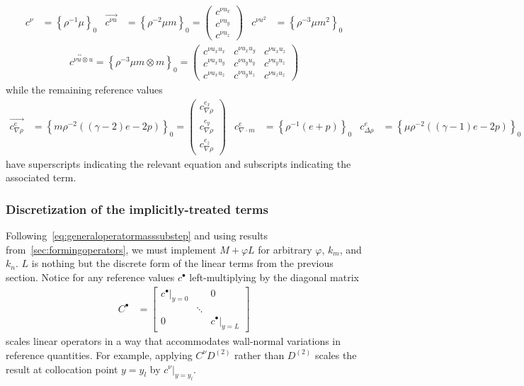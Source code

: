 \documentclass[letterpaper,11pt,nointlimits,reqno,draft]{amsart}
\newcommand{\reference}[1]{\ensuremath{\left\{#1\right\}_{0}}}
\begin{document}
\begin{align}
  c^{\nu} &= \reference{\rho^{-1}\mu}
&
  \overrightarrow{c^{\nu{}u}} &= \reference{\rho^{-2}\mu{}m}
  = \begin{pmatrix} c^{\nu{}u_x} \\ c^{\nu{}u_y} \\ c^{\nu{}u_z} \end{pmatrix}
&
  c^{\nu{}u^2} &= \reference{\rho^{-3}\mu{}m^2}
\end{align}
\begin{align}
   \overleftrightarrow{c^{\nu{}u\otimes{}u}}
  = \reference{\rho^{-3}\mu{}m\otimes{}m}
  = \begin{pmatrix}
   c^{\nu{} u_x u_x} & c^{\nu{} u_x u_y} & c^{\nu{} u_x u_z} \\
   c^{\nu{} u_x u_y} & c^{\nu{} u_y u_y} & c^{\nu{} u_y u_z} \\
   c^{\nu{} u_x u_z} & c^{\nu{} u_y u_z} & c^{\nu{} u_z u_z}
  \end{pmatrix}
\end{align}
while the remaining reference values
\begin{align}
  \overrightarrow{c^{e}_{\nabla\rho}} &= \reference{
        m\rho^{-2}\left(\left(\gamma-2\right)e-2p\right)
  }
  = \begin{pmatrix}
      c^{e_{x}}_{\nabla\rho} \\
      c^{e_{y}}_{\nabla\rho} \\
      c^{e_{z}}_{\nabla\rho}
  \end{pmatrix}
&
  c^{e}_{\nabla\cdot{}m} &= \reference{
        \rho^{-1}\left(e + p\right)
  }
&
  c^{e}_{\Delta\rho} &= \reference{
        \mu\rho^{-2}\left(\left(\gamma-1\right)e-2p\right)
  }
\end{align}
have superscripts indicating the relevant equation and
subscripts indicating the associated term.

\subsubsection{Discretization of the implicitly-treated terms}
\label{sec:discretizationofimplicitterms}

Following~\eqref{eq:generaloperatormasssubstep} and using results
from~\ref{sec:formingoperators}, we must implement $M+\varphi{}L$ for arbitrary
$\varphi$, $k_m$, and $k_n$. $L$ is nothing but the discrete form of the linear
terms from the previous section.  Notice for any reference values
$c^{\bullet}$ left-multiplying by the diagonal matrix
\begin{align}
  C^{\bullet} &= \begin{bmatrix}
   \left.c^{\bullet}\right|_{y=0} &        & 0 \\
                                  & \ddots &    \\
   0                              &        & \left.c^{\bullet}\right|_{y=L}
   \end{bmatrix}
\end{align}
scales linear operators in a way that accommodates wall-normal variations in
reference quantities.  For example, applying $C^{\nu}D^{(2)}$ rather than
$D^{(2)}$ scales the result at collocation point $y=y_l$ by
$\left.c^{\nu}\right|_{y=y_l}$.
\end{document}
